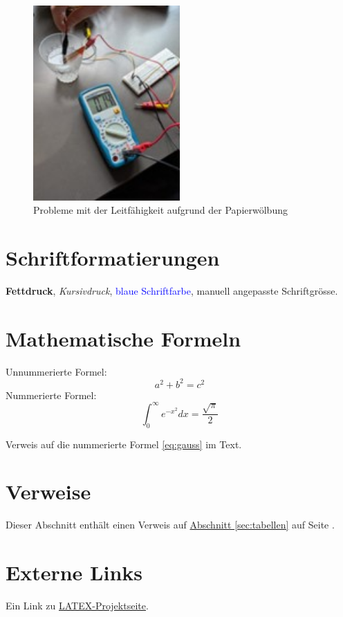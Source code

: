 \documentclass[a4paper,12pt]{article}
\begin{document}
\begin{figure}[h!]
\centering
\includegraphics[width=0.5\textwidth]{Bild6}
\caption{Probleme mit der Leitfähigkeit aufgrund der Papierwölbung}
\label{fig:bild6}
\end{figure}



\section{Schriftformatierungen}
\textbf{Fettdruck}, \textit{Kursivdruck}, \textcolor{blue}{blaue Schriftfarbe}, \Large manuell angepasste Schriftgrösse.

\section{Mathematische Formeln}
Unnummerierte Formel:
\[
a^2 + b^2 = c^2
\]
Nummerierte Formel:
\begin{equation}
\int_{0}^{\infty} e^{-x^2} dx = \frac{\sqrt{\pi}}{2}
\label{eq:gauss}
\end{equation}

Verweis auf die nummerierte Formel \eqref{eq:gauss} im Text.

\section{Verweise}
Dieser Abschnitt enthält einen Verweis auf \hyperref[sec:tabellen]{Abschnitt \ref*{sec:tabellen}} auf Seite \pageref{sec:tabellen}.

\section{Externe Links}
Ein Link zu \href{https://www.latex-project.org}{LATEX-Projektseite}.
\end{document}
